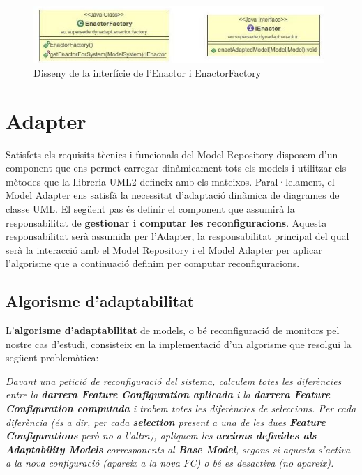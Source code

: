 \begin{figure}
\centering
\includegraphics[width=11cm]{Figures/Figure24}
\decoRule
\caption{Disseny de la interfície de l'Enactor i EnactorFactory}
\label{fig:Figura24}
\end{figure}

\section{Adapter}

Satisfets els requisits tècnics i funcionals del Model Repository disposem d'un component que ens permet carregar dinàmicament tots els models i utilitzar els mètodes que la llibreria UML2 defineix amb els mateixos. Paral·lelament, el Model Adapter ens satisfà la necessitat d'adaptació dinàmica de diagrames de classe UML. El següent pas és definir el component que assumirà la responsabilitat de \textbf{gestionar i computar les reconfiguracions}. Aquesta responsabilitat serà assumida per l'Adapter, la responsabilitat principal del qual serà la interacció amb el Model Repository i el Model Adapter per aplicar l'algorisme que a continuació definim per computar reconfiguracions.\\

\subsection{Algorisme d'adaptabilitat}

L'\textbf{algorisme d'adaptabilitat} de models, o bé reconfiguració de monitors pel nostre cas d'estudi, consisteix en la implementació d'un algorisme que resolgui la següent problemàtica:

\begin{center}
\textit{Davant una petició de reconfiguració del sistema, calculem totes les diferències entre la \textbf{darrera Feature Configuration aplicada} i la \textbf{darrera Feature Configuration computada} i trobem totes les diferències de seleccions. Per cada diferència (és a dir, per cada \textbf{selection} present a una de les dues \textbf{Feature Configurations} però no a l'altra), apliquem les \textbf{accions definides als Adaptability Models} corresponents al \textbf{Base Model}, segons si aquesta s'activa a la nova configuració (apareix a la nova FC) o bé es desactiva (no apareix).}
\end{center}

